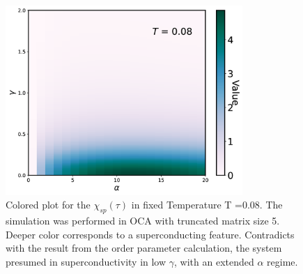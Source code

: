 \documentclass{article}[12pt]
\begin{document}
\begin{spacing}{1.3}
\begin{figure}[H]
\vfill
\end{figure}
\pagebreak
\newpage
\begin{figure}[H]
  \centerline{\includegraphics[width=9cm]{TexFigure/4/4_4_05_oc_colormap.png}}
  \caption{Colored plot for the $\chi_{sp}(\tau)$ in fixed Temperature T =0.08. The simulation was performed in OCA with truncated matrix size 5. Deeper color corresponds to a superconducting feature. Contradicts with the result from the order parameter calculation, the system presumed in superconductivity in low $\gamma$, with an extended $\alpha$ regime.}
 \end{figure}
\end{spacing}
\end{document}
